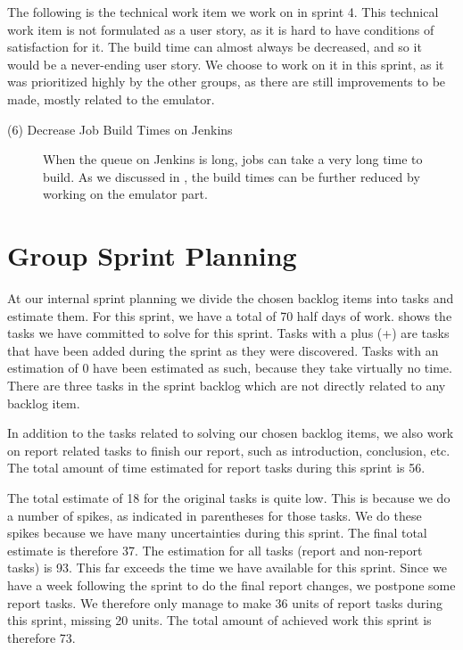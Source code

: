 The following is the technical work item we work on in sprint 4. This technical work item is not formulated as a user story, as it is hard to have conditions of satisfaction for it. The build time can almost always be decreased, and so it would be a never-ending user story. We choose to work on it in this sprint, as it was prioritized highly by the other groups, as there are still improvements to be made, mostly related to the emulator.

\begin{description}
  \item[(6) Decrease Job Build Times on Jenkins] When the queue on Jenkins is long, jobs can take a very long time to build. As we discussed in , the build times can be further reduced by working on the emulator part.
\end{description}

\section{Group Sprint Planning}\label{sec:S4_group}
At our internal sprint planning we divide the chosen backlog items into tasks and estimate them. For this sprint, we have a total of 70 half days of work.  shows the tasks we have committed to solve for this sprint. Tasks with a plus (+) are tasks that have been added during the sprint as they were discovered. Tasks with an estimation of 0 have been estimated as such, because they take virtually no time. There are three tasks in the sprint backlog which are not directly related to any backlog item.

In addition to the tasks related to solving our chosen backlog items, we also work on report related tasks to finish our report, such as introduction, conclusion, etc. The total amount of time estimated for report tasks during this sprint is 56.

The total estimate of 18 for the original tasks is quite low. This is because we do a number of spikes, as indicated in parentheses for those tasks. We do these spikes because we have many uncertainties during this sprint. The final total estimate is therefore 37. The estimation for all tasks (report and non-report tasks) is 93. This far exceeds the time we have available for this sprint. Since we have a week following the sprint to do the final report changes, we postpone some report tasks. We therefore only manage to make 36 units of report tasks during this sprint, missing 20 units. The total amount of achieved work this sprint is therefore 73.

